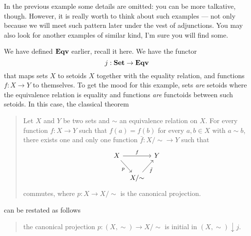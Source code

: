 \begin{exercise}
In the previous example some details are omitted: you can be more talkative, though. However, it is really worth to think about such examples --- not only because we will meet such pattern later under the vest of adjunctions. You may also look for another examples of similar kind, I'm sure you will find some.
\end{exercise}

\begin{example}
We have defined \(\mathbf{Eqv}\) earlier, recall it here. We have the functor
\[j : \mathbf{Set} \to \mathbf{Eqv}\]
that maps sets \(X\) to setoids \(X\) together with the equality relation, and functions \(f : X \to Y\) to themselves. To get the mood for this example, sets {\em are} setoids where the equivalence relation is equality and functions {\em are} functoids between such setoids. In this case, the classical theorem
\begin{quotation}
Let \(X\) and \(Y\) be two sets and \(\sim\) an equivalence relation on \(X\). For every function \(f : X \to Y\) such that \(f(a) = f(b)\) for every \(a, b \in X\) with \(a \sim b\), there exists one and only one function \(\bar f : X{/}{\sim} \to Y\) such that
\[\begin{tikzcd}[column sep=tiny]
X \ar["f", rr] \ar["p", swap, dr] & & Y \\
& X{/}{\sim} \ar["{\bar f}", swap, ur]
\end{tikzcd}\]
commutes, where \(p : X \to X{/}{\sim}\) is the canonical projection.
\end{quotation}
can be restated as follows
\begin{quotation}
the canonical projection \(p : (X, \sim) \to X{/}{\sim}\) is initial in \((X, \sim) \downarrow j\).
\end{quotation}
\end{example}

